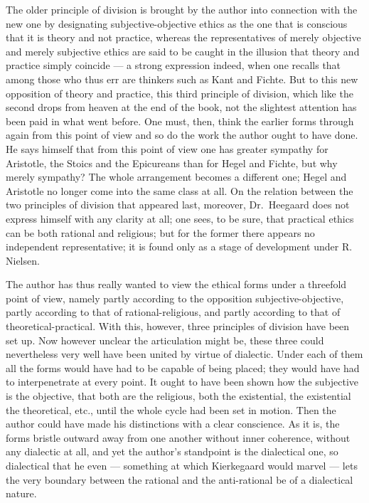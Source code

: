 \documentclass[12pt,a4paper,openany]{book}
\newcommand{\opage}[1]{\marginnote{\footnotesize\textit{[#1]}}}
\begin{document}
The older principle of division is brought by the author into connection
with the new one by designating subjective-objective ethics as the one that
is conscious that it is theory and not practice, whereas the
representatives of merely objective and merely subjective ethics are said
to be caught in the illusion that theory and practice simply coincide ---
a strong expression indeed, when one recalls that among those who thus err
are thinkers such as Kant and Fichte. But to this new opposition of theory
and practice, this third principle of division, which like the second drops
from heaven at the end of the book, not the slightest attention has been
paid in what went before. One must, then, think the earlier forms through
again from this point of view and so do the work the author ought to have
done. He says himself that from this point of view one has greater sympathy
for Aristotle, the Stoics and the Epicureans than for Hegel and Fichte, but
why merely sympathy? The whole arrangement becomes a different one; Hegel
and Aristotle no longer come into the same class at all. On the relation
between the two principles of division that appeared last, moreover, Dr.~Heegaard
does not express himself with any clarity at all; one sees, to be
sure, that practical ethics can be both rational and religious; but for the
former there appears no independent representative; it is found only as a
stage of development under R. Nielsen.

The author has thus really wanted to view the ethical forms under a
threefold point of view, namely partly according to the opposition
subjective-objective, partly according to that of rational-religious, and
partly according to that of theoretical-practical. With this, however,
three principles of division have been set up. Now however unclear the
articulation might be, these three could nevertheless very well have been
united by virtue of dialectic. Under each of them all the forms would have
had to be capable of being
\opage{32}placed; they would have had to interpenetrate at every point. It
ought to have been shown how the subjective is the objective, that both are
the religious, both the existential, the existential the theoretical, etc.,
until the whole cycle had been set in motion. Then the author could have
made his distinctions with a clear conscience. As it is, the forms bristle
outward away from one another without inner coherence, without any
dialectic at all, and yet the author's standpoint is the dialectical one,
so dialectical that he even --- something at which Kierkegaard would marvel
--- lets the very boundary between the rational and the anti-rational be of
a dialectical nature.
\end{document}
